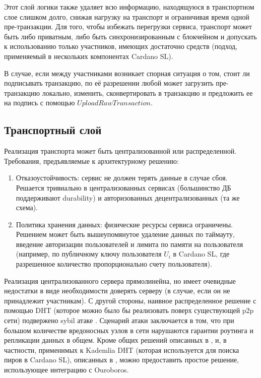\documentclass[specification,annotation]{itmo-student-thesis}
\begin{document}
Этот слой логики также удаляет всю информацию, находящуюся в
транспортном слое слишком долго, снижая нагрузку на транспорт и
ограничивая время одной пре-транзакции. Для того, чтобы избежать
перегрузки сервиса, транспорт может быть либо приватным, либо быть
синхронизированным с блокчейном и допускать к использованию только
участников, имеющих достаточно средств (подход, применяемый в
нескольких компонентах Cardano SL).

В случае, если между участниками возникает спорная ситуация о том,
стоит ли подписывать транзакцию, по её разрешении любой может
загрузить пре-транзакцию локально, изменить, сконвертировать в
транзакцию и предложить ее на подпись с помощью
$UploadRawTransaction$.

\subsection{Транспортный слой}

Реализация транспорта может быть централизованной или
распределенной. Требования, предъявляемые к архитектурному решению:
\begin{enumerate}
\item Отказоустойчивость: сервис не должен терять данные в случае
  сбоя. Решается тривиально в централизованных сервисах (большинство
  ДБ поддерживают durability) и авторизованных децентрализованных (та
  же схема).
\item Политика хранения данных: физические ресурсы сервиса
  ограничены. Решением может быть вышеупомянутое удаление данных по
  таймауту, введение авторизации пользователей и лимита по памяти на
  пользователя (например, по публичному ключу пользователя $U_i$ в
  Cardano SL, где разрешенное количество пропорционально счету
  пользователя).
\end{enumerate}

Реализация централизованного сервера прямолинейна, но имеет очевидные
недостатки в виде необходимости доверять серверу (в случае, если он не
принадлежит участникам). С другой стороны, наивное распределенное
решение с помощью DHT (которое можно было бы реализовать поверх
существующей p2p сети) подвержено sybil атаке
\cite{dinger2006defending}. Сценарий атаки заключается в том, что при
большом количестве вредоносных узлов в сети нарушаются гарантии
роутинга и репликации данных в общем. Кроме общих решений описанных в
\cite{dinger2006defending}, и, в частности, применимых к Kademlia DHT
\cite{maymounkov2002kademlia} (которая используется для поиска пиров в
Cardano SL), описанных в \cite{wang2008attacking}, можно предоставить
простое решение, использующее интеграцию с Ouroboros.
\end{document}
